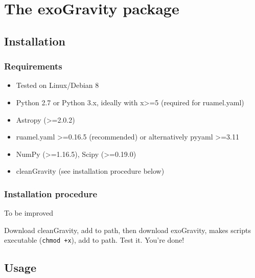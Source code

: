 \section{The exoGravity package}

\subsection{Installation}

\subsubsection{Requirements}

\begin{itemize}
\item{Tested on Linux/Debian 8}
\item{Python 2.7 or Python 3.x, ideally with x>=5 (required for ruamel.yaml)}
\item{Astropy (>=2.0.2)}
\item{ruamel.yaml >=0.16.5 (recommended) or alternatively pyyaml >=3.11}
\item{NumPy (>=1.16.5), Scipy (>=0.19.0)}
\item{cleanGravity (see installation procedure below)}  
\end{itemize}


\subsubsection{Installation procedure}
To be improved

Download cleanGravity, add to path, then download exoGravity, makes scripts executable (\verb|chmod +x|), add to path. Test it. You're done!



\subsection{Usage}

